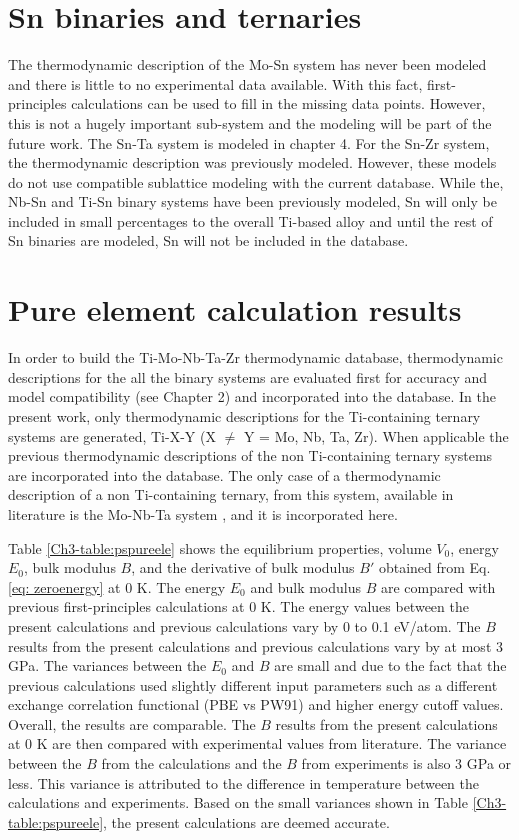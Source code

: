\section{Sn binaries and ternaries}

The thermodynamic description of the Mo-Sn system has never been modeled and there is little to no experimental data available. With this fact, first-principles calculations can be used to fill in the missing data points. However, this is not a hugely important sub-system and the modeling will be part of the future work. The Sn-Ta system is modeled in chapter 4. For the Sn-Zr system, the thermodynamic description was previously modeled. However, these models do not use compatible sublattice modeling with the current database. While the, Nb-Sn and Ti-Sn binary systems have been previously modeled, Sn will only be included in small percentages to the overall Ti-based alloy and until the rest of Sn binaries are modeled, Sn will not be included in the database.

\section{Pure element calculation results}

In order to build the Ti-Mo-Nb-Ta-Zr thermodynamic database, thermodynamic descriptions for the all the binary systems are evaluated first for accuracy and model compatibility (see Chapter 2) and incorporated into the database. In the present work, only thermodynamic descriptions for the Ti-containing ternary systems are generated, Ti-X-Y (X $\neq$ Y = Mo, Nb, Ta, Zr). When applicable the previous thermodynamic descriptions of the non Ti-containing ternary systems are incorporated into the database. The only case of a thermodynamic description of a non Ti-containing ternary, from this system, available in literature is the Mo-Nb-Ta system \cite{Xiong2004}, and it is incorporated here.

Table \ref{Ch3-table:pspureele} shows the equilibrium properties, volume $V_{0}$, energy $E_{0}$, bulk modulus $B$, and the derivative of bulk modulus $B'$ obtained from Eq. \ref{eq: zeroenergy} at 0 K. The energy $E_{0}$ and bulk modulus $B$ are compared with previous first-principles calculations at 0 K. The energy values between the present calculations and previous calculations vary by 0 to 0.1 eV/atom. The $B$ results from the present calculations and previous calculations vary by at most 3 GPa. The variances between the $E_{0}$ and $B$ are small and due to the fact that the previous calculations used slightly different input parameters such as a different exchange correlation functional (PBE vs PW91) and higher energy cutoff values. Overall, the results are comparable. The $B$ results from the present calculations at 0 K are then compared with experimental values from literature. The variance between the $B$ from the calculations and the $B$ from experiments is also 3 GPa or less. This variance is attributed to the difference in temperature between the calculations and experiments. Based on the small variances shown in Table \ref{Ch3-table:pspureele}, the present calculations are deemed accurate. 


